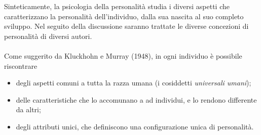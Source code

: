 \documentclass{subfiles}
\begin{document}
Sinteticamente, la psicologia della personalità studia i diversi aspetti che caratterizzano la personalità dell'individuo,
dalla sua nascita al suo completo sviluppo. Nel seguito della discussione saranno trattate le diverse concezioni di personalità di diversi autori.
\\ \\
Come suggerito da Kluckhohn e Murray (1948), in ogni individuo è possibile riscontrare
\begin{itemize}
    \item degli aspetti comuni a tutta la razza umana (i cosiddetti \emph{universali umani});
    \item delle caratteristiche che lo accomunano a ad individui, e lo rendono differente da altri;
    \item degli attributi unici, che definiscono una configurazione unica di personalità.
\end{itemize}
\end{document}
